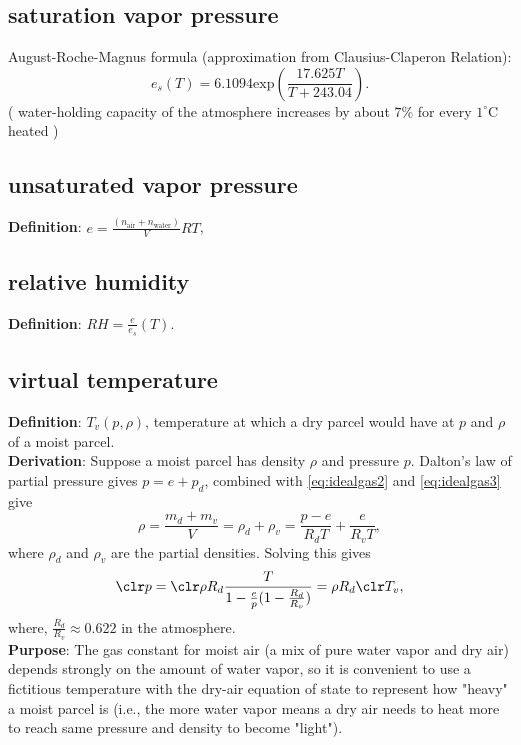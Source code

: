 \subsection{saturation vapor pressure}
August-Roche-Magnus formula (approximation from Clausius-Claperon Relation): \\
\begin{equation}
   e_s(T) = 6.1094 \text{exp}(\frac{17.625T}{T+243.04}).
\end{equation}
( water-holding capacity of the atmosphere increases by about $7\%$ for every $1^{\circ}$C heated )

\subsection{unsaturated vapor pressure}
{\bf Definition}: $e = \frac{(n_{\text{air}} + n_{\text{water}})}{V}RT$, 

\subsection{relative humidity}
{\bf Definition}: $RH = \frac{e}{e_s}(T)$.

\subsection{virtual temperature}

{\bf Definition}: $T_v(p,\rho)$, temperature at which a dry parcel would have at $p$ and $\rho$ of a
moist parcel. \\

{\bf Derivation}: Suppose a moist parcel has density $\rho$ and pressure $p$.
Dalton's law of partial pressure gives $p = e + p_d$, combined with \eqref{eq:idealgas2} and
\eqref{eq:idealgas3} give
\begin{equation}
   \rho = \frac{m_d + m_v}{V} = \rho_d + \rho_v = \frac{p-e}{R_dT} + \frac{e}{R_vT}, 
\end{equation}
where $\rho_d$ and $\rho_v$ are the partial densities.
Solving this gives
\begin{equation}
   {\clr p} = {\clr \rho} R_d \frac{T}{1-\frac{e}{p}(1-\frac{R_d}{R_v})} = \rho R_d {\clr T_v},
\end{equation}
where, $\frac{R_d}{R_v} \approx 0.622$ in the atmosphere. \\

{\bf Purpose}:
The gas constant for moist air (a mix of pure water vapor and dry air) depends strongly on the
amount of water vapor, so it is convenient to use a fictitious temperature with the dry-air equation
of state to represent how "heavy" a moist parcel is (i.e., the more water vapor means a dry air
needs to heat more to reach same pressure and density to become "light"). \\

